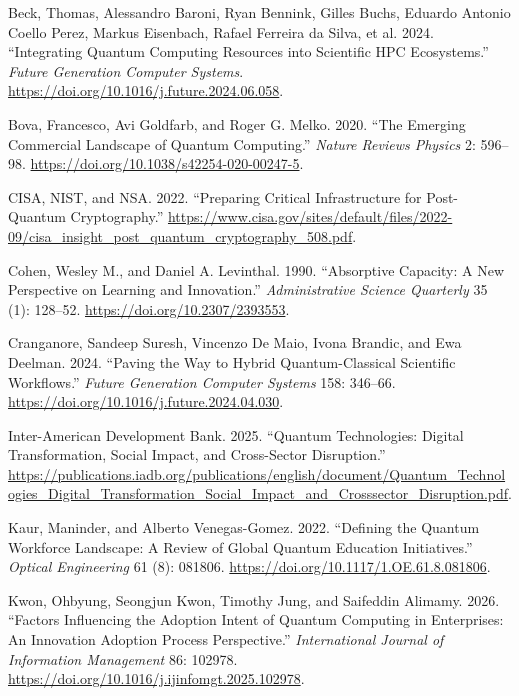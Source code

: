 \documentclass[
  11pt,
  letterpaper,
]{article}
\newlength{\cslhangindent}
\newenvironment{CSLReferences}[2] %
 {\begin{list}{}{%
  \setlength{\itemindent}{0pt}
  \setlength{\leftmargin}{0pt}
  \setlength{\parsep}{0pt}
  \ifodd #1
   \setlength{\leftmargin}{\cslhangindent}
   \setlength{\itemindent}{-1\cslhangindent}
  \fi
  \setlength{\itemsep}{#2\baselineskip}}}
 {\end{list}}
\begin{document}
\label{refs}
\begin{CSLReferences}{1}{0}
Beck, Thomas, Alessandro Baroni, Ryan Bennink, Gilles Buchs, Eduardo
Antonio Coello Perez, Markus Eisenbach, Rafael Ferreira da Silva, et al.
2024. {``Integrating Quantum Computing Resources into Scientific HPC
Ecosystems.''} \emph{Future Generation Computer Systems}.
\url{https://doi.org/10.1016/j.future.2024.06.058}.

Bova, Francesco, Avi Goldfarb, and Roger G. Melko. 2020. {``The Emerging
Commercial Landscape of Quantum Computing.''} \emph{Nature Reviews
Physics} 2: 596--98. \url{https://doi.org/10.1038/s42254-020-00247-5}.

CISA, NIST, and NSA. 2022. {``Preparing Critical Infrastructure for
Post-Quantum Cryptography.''}
\url{https://www.cisa.gov/sites/default/files/2022-09/cisa_insight_post_quantum_cryptography_508.pdf}.

Cohen, Wesley M., and Daniel A. Levinthal. 1990. {``Absorptive Capacity:
A New Perspective on Learning and Innovation.''} \emph{Administrative
Science Quarterly} 35 (1): 128--52.
\url{https://doi.org/10.2307/2393553}.

Cranganore, Sandeep Suresh, Vincenzo De Maio, Ivona Brandic, and Ewa
Deelman. 2024. {``Paving the Way to Hybrid Quantum-Classical Scientific
Workflows.''} \emph{Future Generation Computer Systems} 158: 346--66.
\url{https://doi.org/10.1016/j.future.2024.04.030}.

Inter-American Development Bank. 2025. {``Quantum Technologies: Digital
Transformation, Social Impact, and Cross-Sector Disruption.''}
\url{https://publications.iadb.org/publications/english/document/Quantum_Technologies_Digital_Transformation_Social_Impact_and_Crosssector_Disruption.pdf}.

Kaur, Maninder, and Alberto Venegas-Gomez. 2022. {``Defining the Quantum
Workforce Landscape: A Review of Global Quantum Education
Initiatives.''} \emph{Optical Engineering} 61 (8): 081806.
\url{https://doi.org/10.1117/1.OE.61.8.081806}.

Kwon, Ohbyung, Seongjun Kwon, Timothy Jung, and Saifeddin Alimamy. 2026.
{``Factors Influencing the Adoption Intent of Quantum Computing in
Enterprises: An Innovation Adoption Process Perspective.''}
\emph{International Journal of Information Management} 86: 102978.
\url{https://doi.org/10.1016/j.ijinfomgt.2025.102978}.


\end{CSLReferences}
\end{document}
